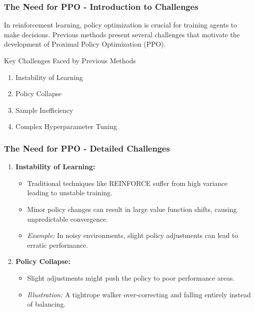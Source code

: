 \documentclass{beamer}
\begin{document}
\begin{frame}[fragile]
    \frametitle{The Need for PPO - Introduction to Challenges}
    In reinforcement learning, policy optimization is crucial for training agents to make decisions. Previous methods present several challenges that motivate the development of Proximal Policy Optimization (PPO).
    
    \begin{block}{Key Challenges Faced by Previous Methods}
        \begin{enumerate}
            \item Instability of Learning
            \item Policy Collapse
            \item Sample Inefficiency
            \item Complex Hyperparameter Tuning
        \end{enumerate}
    \end{block}
\end{frame}

\begin{frame}[fragile]
    \frametitle{The Need for PPO - Detailed Challenges}
    \begin{enumerate}
        \item \textbf{Instability of Learning:}
        \begin{itemize}
            \item Traditional techniques like REINFORCE suffer from high variance leading to unstable training.
            \item Minor policy changes can result in large value function shifts, causing unpredictable convergence.
            \item \textit{Example:} In noisy environments, slight policy adjustments can lead to erratic performance.
        \end{itemize}
        
        \item \textbf{Policy Collapse:}
        \begin{itemize}
            \item Slight adjustments might push the policy to poor performance areas.
            \item \textit{Illustration:} A tightrope walker over-correcting and falling entirely instead of balancing.
        \end{itemize}
    \end{enumerate}
\end{frame}
\end{document}
